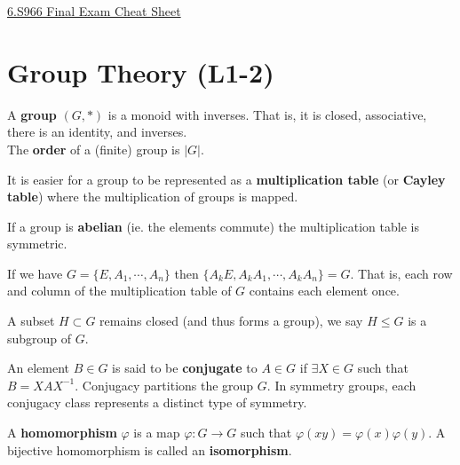 \documentclass[9pt]{article}
\begin{document}
\raggedright
\begin{multicols}{2}


\setlength{\premulticols}{1pt}
\setlength{\postmulticols}{1pt}
\setlength{\multicolsep}{1pt}
\setlength{\columnsep}{2pt}

\begin{center}
     \Large{\underline{6.S966 Final Exam Cheat Sheet}} \\
\end{center}
% 
% 

\section{Group Theory (L1-2)}

A \textbf{group} $(G,*)$ is a monoid with inverses. That is, it is closed, associative, there is an identity, and inverses. \\

The \textbf{order} of a (finite) group is $|G|$. 

It is easier for a group to be represented as a \textbf{multiplication table} (or \textbf{Cayley table}) where the multiplication of groups is mapped. 

If a group is \textbf{abelian} (ie. the elements commute) the multiplication table is symmetric.

\begin{theorem}
    If we have $G=\{E,A_1,\cdots,A_n\}$ then $\{A_kE,A_kA_1,\cdots,A_kA_n\}=G$. That is, each row and column
    of the multiplication table of $G$ contains each element once.
\end{theorem}

A subset $H \subset G$ remains closed (and thus forms a group), we say $H \le G$ is a subgroup of $G$.

An element $B \in G$ is said to be \textbf{conjugate} to $A \in G$ 
if $\exists X \in G$ such that $B=XAX^{-1}$. Conjugacy partitions the group $G$. In symmetry groups, each conjugacy class represents
a distinct type of symmetry.

A \textbf{homomorphism} $\varphi$ is a map $\varphi:G \to G$ such that $\varphi(xy)=\varphi(x)\varphi(y)$. A bijective homomorphism 
is called an \textbf{isomorphism}. 


\end{multicols}
\end{document}
